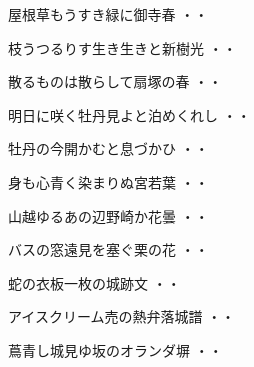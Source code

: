 \vspace{0.6cm}
\begin{shiika}屋根草もうすき緑に御寺春
\hfill{・・}\end{shiika}
\vspace{0.6cm}
\begin{shiika}枝うつるりす生き生きと新樹光
\hfill{・・}\end{shiika}
\vspace{0.6cm}
\begin{shiika}散るものは散らして扇塚の春
\hfill{・・}\end{shiika}
\vspace{0.6cm}
\begin{shiika}明日に咲く牡丹見よと泊めくれし
\hfill{・・}\end{shiika}
\vspace{0.6cm}
\begin{shiika}牡丹の今開かむと息づかひ
\hfill{・・}\end{shiika}
\vspace{0.6cm}
\begin{shiika}身も心青く染まりぬ宮若葉
\hfill{・・}\end{shiika}
\vspace{0.6cm}
\begin{shiika}山越ゆるあの辺野崎か花曇
\hfill{・・}\end{shiika}
\vspace{0.6cm}
\begin{shiika}バスの窓遠見を塞ぐ栗の花
\hfill{・・}\end{shiika}
\vspace{0.6cm}
\begin{shiika}蛇の衣板一枚の城跡文
\hfill{・・}\end{shiika}
\vspace{0.6cm}
\begin{shiika}アイスクリーム売の熱弁落城譜
\hfill{・・}\end{shiika}
\vspace{0.6cm}
\begin{shiika}蔦青し城見ゆ坂のオランダ塀
\hfill{・・}\end{shiika}
